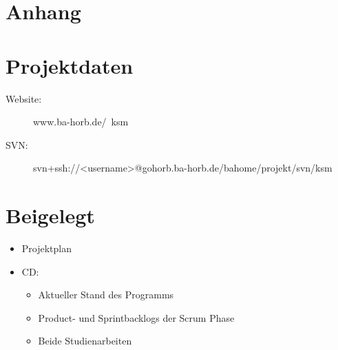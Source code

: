 \section{Anhang}

\lstlistoflistings
\listoffigures
\newpage
\section*{Projektdaten}
\begin{description}
\item[Website:] www.ba-horb.de/~ksm
\item[SVN:] svn+ssh://<username>@gohorb.ba-horb.de/bahome/projekt/svn/ksm
\end{description}

\section*{Beigelegt}
\begin{itemize}
\item Projektplan
\item CD:
	\begin{itemize}
		\item Aktueller Stand des Programms
		\item Product- und Sprintbacklogs der Scrum Phase
		\item Beide Studienarbeiten
	\end{itemize}
\end{itemize}

